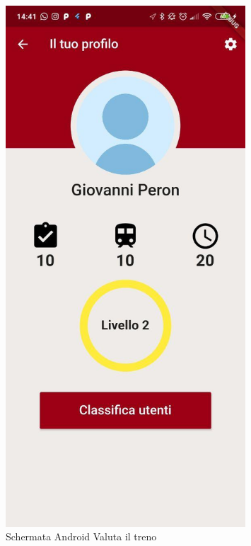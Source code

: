 \begin{minipage}{0.45\textwidth}
	\begin{figure}[H]
		\centering
		\includegraphics[width=0.8\textwidth]{immagini/profile.jpg}
		\caption{Schermata Android Valuta il treno}
	\end{figure}
\end{minipage}
\hfill
